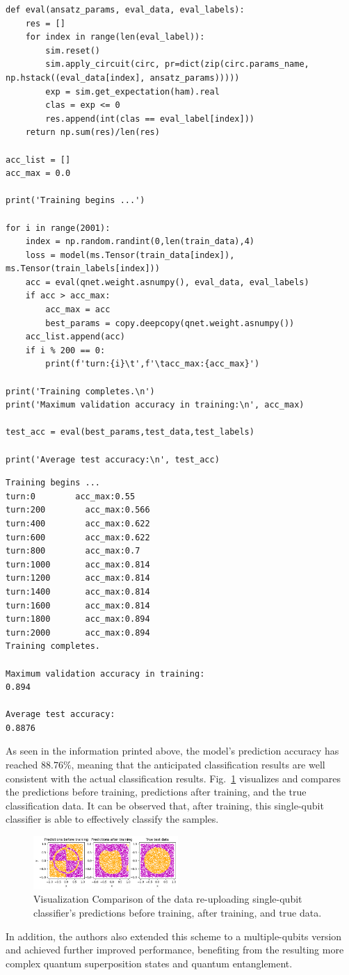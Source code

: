 \begin{lstlisting}
def eval(ansatz_params, eval_data, eval_labels):
    res = []
    for index in range(len(eval_label)):
        sim.reset()
        sim.apply_circuit(circ, pr=dict(zip(circ.params_name, np.hstack((eval_data[index], ansatz_params)))))
        exp = sim.get_expectation(ham).real
        clas = exp <= 0
        res.append(int(clas == eval_label[index]))    
    return np.sum(res)/len(res)

acc_list = []
acc_max = 0.0

print('Training begins ...')

for i in range(2001):
    index = np.random.randint(0,len(train_data),4)
    loss = model(ms.Tensor(train_data[index]), ms.Tensor(train_labels[index]))
    acc = eval(qnet.weight.asnumpy(), eval_data, eval_labels)
    if acc > acc_max:
        acc_max = acc
        best_params = copy.deepcopy(qnet.weight.asnumpy())
    acc_list.append(acc)
    if i % 200 == 0:
        print(f'turn:{i}\t',f'\tacc_max:{acc_max}')
        
print('Training completes.\n')
print('Maximum validation accuracy in training:\n', acc_max)

test_acc = eval(best_params,test_data,test_labels)

print('Average test accuracy:\n', test_acc)
\end{lstlisting}

\begin{lstlisting}
Training begins ...
turn:0	 	  acc_max:0.55
turn:200	 	acc_max:0.566
turn:400	 	acc_max:0.622
turn:600	 	acc_max:0.622
turn:800	 	acc_max:0.7
turn:1000	 	acc_max:0.814
turn:1200	 	acc_max:0.814
turn:1400	 	acc_max:0.814
turn:1600	 	acc_max:0.814
turn:1800	 	acc_max:0.894
turn:2000	 	acc_max:0.894
Training completes.

Maximum validation accuracy in training:
0.894

Average test accuracy: 
0.8876
\end{lstlisting}

As seen in the information printed above, the model's prediction accuracy has reached $88.76\%$, meaning that the anticipated classification results are well consistent with the actual classification results.
Fig.~\ref{data_reuploading_performance} visualizes and compares the predictions before training, predictions after training, and the true classification data. 
It can be observed that, after training, this single-qubit classifier is able to effectively classify the samples.
\begin{figure}[H]
\centering
\includegraphics[width=0.49\textwidth]
{5.4.3_figures/data_reuploading_performance.png}
\caption{Visualization Comparison of the data re-uploading single-qubit classifier's predictions before training, after training, and true data.}
\label{data_reuploading_performance}
\end{figure}

In addition, the authors also extended this scheme to a multiple-qubits version and achieved further improved performance, benefiting from the resulting more complex quantum superposition states and quantum entanglement.
